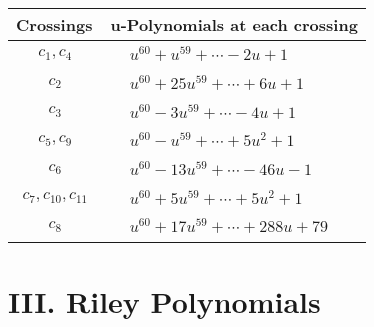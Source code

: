 \documentclass[1p]{elsarticle_modified}
\theoremstyle{definition}
\begin{document}
\begin{tabular}{m{50pt}|m{274pt}}
Crossings & \hspace{64pt}u-Polynomials at each crossing \\
\hline $$\begin{aligned}c_{1},c_{4}\end{aligned}$$&$\begin{aligned}
&u^{60}+u^{59}+\cdots-2 u+1
\end{aligned}$\\
\hline $$\begin{aligned}c_{2}\end{aligned}$$&$\begin{aligned}
&u^{60}+25 u^{59}+\cdots+6 u+1
\end{aligned}$\\
\hline $$\begin{aligned}c_{3}\end{aligned}$$&$\begin{aligned}
&u^{60}-3 u^{59}+\cdots-4 u+1
\end{aligned}$\\
\hline $$\begin{aligned}c_{5},c_{9}\end{aligned}$$&$\begin{aligned}
&u^{60}- u^{59}+\cdots+5 u^2+1
\end{aligned}$\\
\hline $$\begin{aligned}c_{6}\end{aligned}$$&$\begin{aligned}
&u^{60}-13 u^{59}+\cdots-46 u-1
\end{aligned}$\\
\hline $$\begin{aligned}c_{7},c_{10},c_{11}\end{aligned}$$&$\begin{aligned}
&u^{60}+5 u^{59}+\cdots+5 u^2+1
\end{aligned}$\\
\hline $$\begin{aligned}c_{8}\end{aligned}$$&$\begin{aligned}
&u^{60}+17 u^{59}+\cdots+288 u+79
\end{aligned}$\\
\hline
\end{tabular}\newpage\renewcommand{\arraystretch}{1}
\centering \section*{ III. Riley Polynomials}
\end{document}
